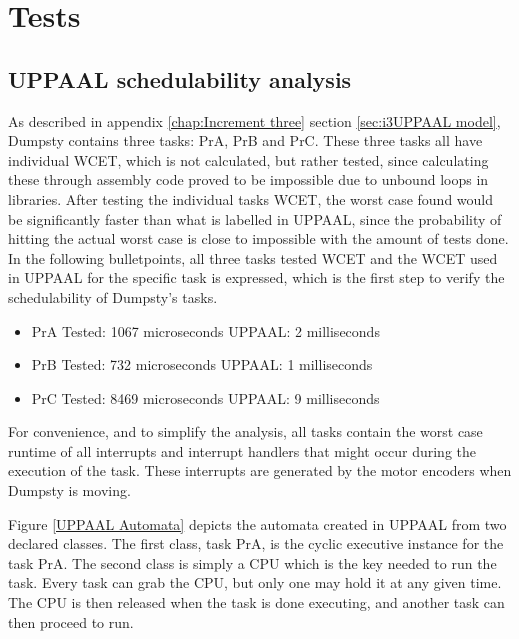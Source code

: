 \chapter{Tests}
\label{chap:Tests}


\section{UPPAAL schedulability analysis}
\label{sec:UPPAAL schedulability}
As described in appendix \ref{chap:Increment three} section  \ref{sec:i3UPPAAL model}, Dumpsty contains three tasks: PrA, PrB and PrC. These three tasks all have individual WCET, which is not calculated, but rather tested, since calculating these through assembly code proved to be impossible due to unbound loops in libraries. After testing the individual tasks WCET, the worst case found would be significantly faster than what is labelled in UPPAAL, since the probability of hitting the actual worst case is close to impossible with the amount of tests done. In the following bulletpoints, all three tasks tested WCET and the WCET used in UPPAAL for the specific task is expressed, which is the first step to verify the schedulability of Dumpsty's tasks.


\begin{itemize}
	\item PrA \tab Tested: 1067 microseconds \tab UPPAAL: 2 milliseconds
	\item PrB \tab Tested: 732  microseconds \tab UPPAAL: 1 milliseconds
	\item PrC \tab	Tested: 8469 microseconds \tab UPPAAL: 9 milliseconds
\end{itemize}


For convenience, and to simplify the analysis, all tasks contain the worst case runtime of all interrupts and interrupt handlers that might occur during the execution of the task. These interrupts are generated by the motor encoders when Dumpsty is moving.


Figure \ref{UPPAAL Automata} depicts the automata created in UPPAAL from two declared classes. The first class, task PrA, is the cyclic executive instance for the task PrA. The second class is simply a CPU which is the key needed to run the task. Every task can grab the CPU, but only one may hold it at any given time. The CPU is then released when the task is done executing, and another task can then proceed to run.


